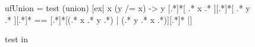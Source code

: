 \begin{figure}
    \begin{smallhskcode}
ufUnion = test (union) [ex| { x { (y /= x) -> y } }
                        { [.*]*[ .* x .* ][.*]*[ .* y .* ][.*]* } 
                          == { [.*]*[(.* x .* y .*) | (.* y .* x .*)][.*]* } |]
    \end{smallhskcode}
    \caption{ test in \ourDSL}
    \label{fig:uf-union-test}
\end{figure}